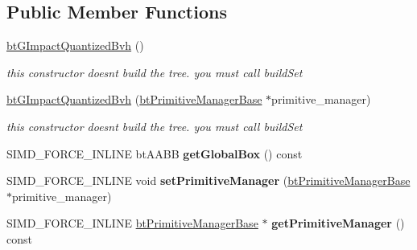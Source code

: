\subsection*{Public Member Functions}
\begin{DoxyCompactItemize}
\item 
\mbox{\label{classbtGImpactQuantizedBvh_a3adf6c64b003214564e045326e4fabb7}} 
\hyperlink{classbtGImpactQuantizedBvh_a3adf6c64b003214564e045326e4fabb7}{bt\+G\+Impact\+Quantized\+Bvh} ()
\begin{DoxyCompactList}\small\item\em this constructor doesn\textquotesingle{}t build the tree. you must call build\+Set \end{DoxyCompactList}\item 
\mbox{\label{classbtGImpactQuantizedBvh_a567d06bf430c21fe4887f1b996bb6ba4}} 
\hyperlink{classbtGImpactQuantizedBvh_a567d06bf430c21fe4887f1b996bb6ba4}{bt\+G\+Impact\+Quantized\+Bvh} (\hyperlink{classbtPrimitiveManagerBase}{bt\+Primitive\+Manager\+Base} $\ast$primitive\+\_\+manager)
\begin{DoxyCompactList}\small\item\em this constructor doesn\textquotesingle{}t build the tree. you must call build\+Set \end{DoxyCompactList}\item 
\mbox{\label{classbtGImpactQuantizedBvh_ae6f71b24b0b7f76ab0807e760da9f448}} 
S\+I\+M\+D\+\_\+\+F\+O\+R\+C\+E\+\_\+\+I\+N\+L\+I\+NE bt\+A\+A\+BB {\bfseries get\+Global\+Box} () const
\item 
\mbox{\label{classbtGImpactQuantizedBvh_ab4e8e255305f61908ca119fb751bf22c}} 
S\+I\+M\+D\+\_\+\+F\+O\+R\+C\+E\+\_\+\+I\+N\+L\+I\+NE void {\bfseries set\+Primitive\+Manager} (\hyperlink{classbtPrimitiveManagerBase}{bt\+Primitive\+Manager\+Base} $\ast$primitive\+\_\+manager)
\item 
\mbox{\label{classbtGImpactQuantizedBvh_a49c35409277baa45df040daf2bf063a6}} 
S\+I\+M\+D\+\_\+\+F\+O\+R\+C\+E\+\_\+\+I\+N\+L\+I\+NE \hyperlink{classbtPrimitiveManagerBase}{bt\+Primitive\+Manager\+Base} $\ast$ {\bfseries get\+Primitive\+Manager} () const
\item 

\end{DoxyCompactItemize}
